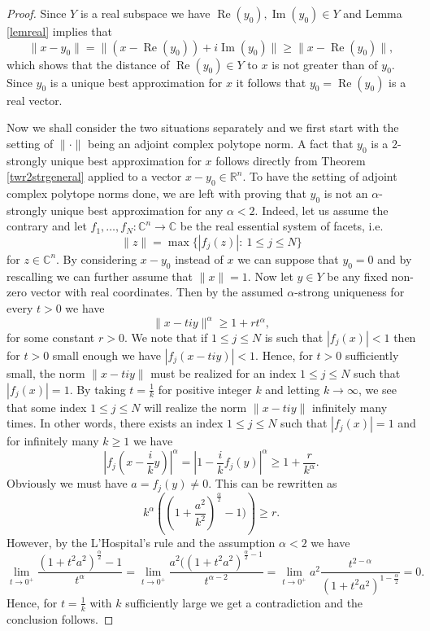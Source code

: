 \documentclass[10pt,a4paper]{amsart}
\DeclareMathOperator{\im}{Im}
\DeclareMathOperator{\re}{Re}
\begin{document}
\begin{proof}
Since $Y$ is a real subspace we have $\re(y_0), \im(y_0) \in Y$ and Lemma \ref{lemreal} implies that
$$\|x-y_0\|=\|(x-\re(y_0)) + i\im(y_0)\| \geq \|x-\re(y_0)\|,$$
which shows that the distance of $\re(y_0) \in Y$ to $x$ is not greater than of $y_0$. Since $y_0$ is a unique best approximation for $x$ it follows that $y_0=\re(y_0)$ is a real vector.

Now we shall consider the two situations separately and we first start with the setting of $\| \cdot \|$ being an adjoint complex polytope norm. A fact that $y_0$ is a $2$-strongly unique best approximation for $x$ follows directly from Theorem \ref{twr2strgeneral} applied to a vector $x-y_0 \in \mathbb{R}^n$. To have the setting of adjoint complex polytope norms done, we are left with proving that $y_0$ is not an $\alpha$-strongly unique best approximation for any $\alpha<2$. Indeed, let us assume the contrary and let $f_1, \ldots, f_N: \mathbb{C}^n \to \mathbb{C}$ be the real essential system of facets, i.e.
$$\|z\| = \max \{|f_j(z)|: \ 1 \leq j \leq N\}$$
for $z \in \mathbb{C}^n$. By considering $x-y_0$ instead of $x$ we can suppose that $y_0=0$ and by rescalling we can further assume that $\|x\|=1$. Now let $y \in Y$ be any fixed non-zero vector with real coordinates. Then by the assumed $\alpha$-strong uniqueness for every $t > 0$ we have
$$\|x-tiy\|^{\alpha} \geq 1 + rt^{\alpha},$$
for some constant $r>0$. We note that if $1 \leq j \leq N$ is such that $|f_j(x)|<1$ then for $t>0$ small enough we have $|f_j(x-tiy)|<1$. Hence, for $t>0$ sufficiently small, the norm $\|x-tiy\|$ must be realized for an index $1 \leq j \leq N$ such that $|f_j(x)|=1$. By taking $t=\frac{1}{k}$ for positive integer $k$ and letting $k \to \infty$, we see that some index $1 \leq j \leq N$ will realize the norm $\|x-tiy\|$ infinitely many times. In other words, there exists an index $1 \leq j \leq N$ such that $|f_j(x)|=1$ and for infinitely many $k \geq 1$ we have
$$\left |f_j\left ( x-\frac{i}{k}y \right ) \right |^{\alpha} = \left | 1 - \frac{i}{k}f_j(y) \right |^{\alpha} \geq 1 + \frac{r}{k^{\alpha}}.$$
Obviously we must have $a=f_j(y) \neq 0$. This can be rewritten as
$$k^{\alpha}\left ( \left ( 1 + \frac{a^2}{k^2} \right )^{\frac{\alpha}{2}} - 1) \right ) \geq r.$$
However, by the L'Hospital's rule and the assumption $\alpha<2$ we have
$$\lim_{t \to 0^+} \frac{\left ( 1 + t^2a^2 \right )^{\frac{\alpha}{2}} - 1}{t^{\alpha}} = \lim_{t \to 0^+} \frac{a^2(\left ( 1 + t^2a^2 \right )^{\frac{\alpha}{2}-1}}{t^{\alpha-2}} = \lim_{t \to 0^+} a^2 \frac{t^{2-\alpha}}{\left ( 1 + t^2a^2 \right )^{1-\frac{\alpha}{2}}} =0.$$
Hence, for $t=\frac{1}{k}$ with $k$ sufficiently large we get a contradiction and the conclusion follows.



\end{proof}
\end{document}
